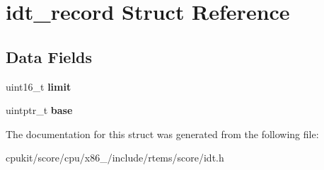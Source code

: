 \hypertarget{structidt__record}{}\section{idt\+\_\+record Struct Reference}
\label{structidt__record}
\subsection*{Data Fields}
\begin{DoxyCompactItemize}
\item 
\mbox{\label{structidt__record_ac7acf47c7123f117473713ae63e2ab70}} 
uint16\+\_\+t {\bfseries limit}
\item 
\mbox{\label{structidt__record_abf36673d0a4cd13c3db9f15d2192d06e}} 
uintptr\+\_\+t {\bfseries base}
\end{DoxyCompactItemize}


The documentation for this struct was generated from the following file\+:\begin{DoxyCompactItemize}
\item 
cpukit/score/cpu/x86\+\_/include/rtems/score/idt.\+h\end{DoxyCompactItemize}
